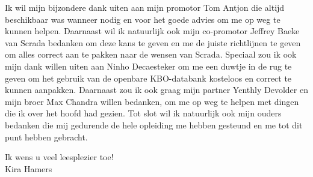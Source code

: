 Ik wil mijn bijzondere dank uiten aan mijn promotor Tom Antjon die altijd beschikbaar was wanneer nodig en voor het goede advies om me op weg te kunnen helpen.
Daarnaast wil ik natuurlijk ook mijn co-promotor Jeffrey Baeke van Scrada bedanken om deze kans te geven en me de juiste richtlijnen te geven om alles correct aan te pakken naar de wensen van Scrada.
Speciaal zou ik ook mijn dank willen uiten aan Ninho Decaesteker om me een duwtje in de rug te geven om het gebruik van de openbare KBO-databank kosteloos en correct te kunnen aanpakken.
Daarnaast zou ik ook graag mijn partner Yenthly Devolder en mijn broer Max Chandra willen bedanken, om me op weg te helpen met dingen die ik over het hoofd had gezien.
Tot slot wil ik natuurlijk ook mijn ouders bedanken die mij gedurende de hele opleiding me hebben gesteund en me tot dit punt hebben gebracht.

\medskip

Ik wens u veel leesplezier toe! \\Kira Hamers